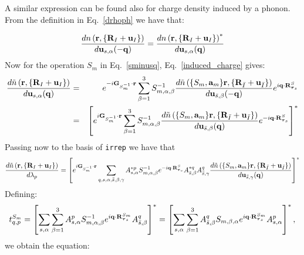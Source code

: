 \documentclass[12pt,a4paper,twoside]{report}
\begin{document}
A similar expression can be found also for charge density induced by a phonon. From the definition in Eq.~\ref{drhoph} we have that:

\begin{equation}
{d n\left({\bf r}, \{{\bf R}_I + {\bf u}_I\}\right)
\over d {\bf u}_{s,\alpha}(-{\bf q})} =
{d n\left({\bf r}, \{{\bf R}_I + {\bf u}_I\}\right)^*
\over d {\bf u}_{s,\alpha}({\bf q})}
\label{drhoph_def}
\end{equation}
Now for the operation $S_m$ in Eq.~\ref{sminusq}, Eq.~\ref{induced_charge} gives:
\begin{eqnarray}
{d \tilde n\left({\bf r}, \{{\bf R}_I + {\bf u}_I\}\right)
\over d {\bf u}_{s,\alpha}({\bf q})} &=& e^{-i{\bf G}_{S^{-1}_m} \cdot {\bf r }} \sum_{\beta=1}^3 S^{-1}_{m,\alpha,\beta} 
{d \tilde n\left(\{S_m,{\bf a}_m\} {\bf r}, \{{\bf R}_{\bar I} + {\bf u}_{\bar I}\}\right)
\over d {\bf u}_{\bar s,\beta} (-{\bf q})} e^{i{\bf q}\cdot {\bf R}^S_{{\boldsymbol{\tau}_s}}} \nonumber \\
&=& \left[
e^{i{\bf G}_{S^{-1}_m} \cdot {\bf r }} \sum_{\beta=1}^3 S^{-1}_{m,\alpha,\beta} 
{d \tilde n\left(\{S_m,{\bf a}_m\} {\bf r}, \{{\bf R}_{\bar I} + {\bf u}_{\bar I}\}\right)
\over d {\bf u}_{\bar s,\beta} ({\bf q})} e^{-i{\bf q}\cdot {\bf R}^S_{{\boldsymbol{\tau}_s}}}\right]^*
\nonumber \\
\label{induced_charge_minusq}
\end{eqnarray}
Passing now to the basis of \texttt{irrep} we have that
\begin{equation}
{d \tilde n\left({\bf r}, \{{\bf R}_I + {\bf u}_I\}\right)
\over d \lambda_p} =
\left[
e^{i{\bf G}_{S^{-1}_m} \cdot {\bf r }} \sum_{q,s,\alpha,\bar{\bar s},\beta,\gamma} A^{*p}_{s,\alpha}S^{-1}_{m,\alpha,\beta} e^{-i{\bf q}\cdot {\bf R}^S_{{\boldsymbol{\tau}_s}}} A^{*q}_{\bar s,\beta} A^{q}_{\bar {\bar s},\gamma}
{d \tilde n\left(\{S_m,{\bf a}_m\} {\bf r}, \{{\bf R}_{\bar I} + {\bf u}_{\bar I}\}\right)
\over d {\bf u}_{\bar {\bar s},\gamma} ({\bf q})} \right]^*
\end{equation}
Defining:
\begin{equation}
t_{q,p}^{S_m}= \left[
\sum_{s,\alpha}
\sum_{\beta=1}^3 A^p_{s,\alpha} S^{-1}_{m,\alpha,\beta} e^{i{\bf q}\cdot {\bf R}^{S_m}_{{\boldsymbol{\tau}_s}}} A^{q}_{\bar s,\beta}\right]^* = \left[\sum_{s,\alpha}
\sum_{\beta=1}^3 A^{q}_{\bar s,\beta} S_{m,\beta,\alpha} e^{i{\bf q}\cdot {\bf R}^{S_m}_{{\boldsymbol{\tau}_s}}} A^p_{s,\alpha}\right]^*,
\label{ttr}
\end{equation}
we obtain the equation:
\end{document}
